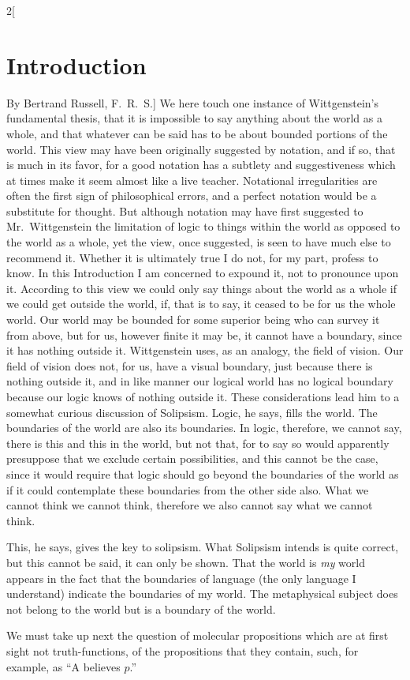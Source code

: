 \documentclass[oneside,openany,12pt]{book}
\begin{document}
\begin{multicols}{2}[\section*{Introduction}By Bertrand Russell, F.\ R.\ S.]
We here touch one instance of Wittgenstein's fundamental thesis, that it is impossible to say anything about the world as a whole, and that whatever can be said has to be about bounded portions of the world. This view may have been originally suggested by notation, and if so, that is much in its favor, for a good notation has a subtlety and suggestiveness which at times make it seem almost like a live teacher. Notational irregularities are often the first sign of philosophical errors, and a perfect notation would be a substitute for thought. But although notation may have first suggested to Mr.\ Wittgenstein the limitation of logic to things within the world as opposed to the world as a whole, yet the view, once suggested, is seen to have much else to recommend it. Whether it is ultimately true I do not, for my part, profess to know. In this Introduction I am concerned to expound it, not to pronounce upon it. According to this view we could only say things about the world as a whole if we could get outside the world, if, that is to say, it ceased to be for us the whole world. Our world may be bounded for some superior being who can survey it from above, but for us, however finite it may be, it cannot have a boundary, since it has nothing outside it. Wittgenstein uses, as an analogy, the field of vision. Our field of vision does not, for us, have a visual boundary, just because there is nothing outside it, and in like manner our logical world has no logical boundary because our logic knows of nothing outside it. These considerations lead him to a somewhat curious discussion of Solipsism. Logic, he says, fills the world. The boundaries of the world are also its boundaries. In logic, therefore, we cannot say, there is this and this in the world, but not that, for to say so would apparently presuppose that we exclude certain possibilities, and this cannot be the case, since it would require that logic should go beyond the boundaries of the world as if it could contemplate these boundaries from the other side also. What we cannot think we cannot think, therefore we also cannot say what we cannot think.

This, he says, gives the key to solipsism. What Solipsism intends is quite correct, but this cannot be said, it can only be shown. That the world is \emph{my} world appears in the fact that the boundaries of language (the only language I understand) indicate the boundaries of my world. The metaphysical subject does not belong to the world but is a boundary of the world.

We must take up next the question of molecular propositions which are at first sight not truth-functions, of the propositions that they contain, such, for example, as ``A believes $p$.''


\end{multicols}
\end{document}
